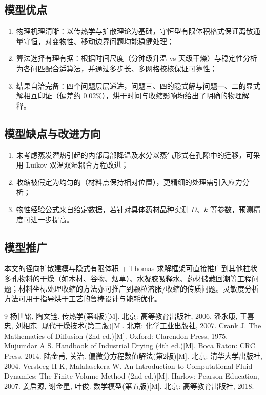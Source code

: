 \documentclass[withoutpreface,bwprint]{cumcmthesis} %
\begin{document}
\subsection{模型优点}

\begin{enumerate}
\item 物理机理清晰：以传热学与扩散理论为基础，守恒型有限体积格式保证离散通量守恒，对变物性、移动边界问题均能稳健处理；
\item 算法选择有理有据：根据时间尺度（分钟级升温 vs 天级干燥）与稳定性分析为各问匹配合适算法，并通过多步长、多网格校核保证可靠性；
\item 结果自洽完备：四个问题层层递进，问题三、四的隐式解与问题一、二的显式解相互印证（偏差约 0.02\%），烘干时间与收缩影响均给出了明确的物理解释。
\end{enumerate}

\subsection{模型缺点与改进方向}

\begin{enumerate}
\item 未考虑蒸发潜热引起的内部局部降温及水分以蒸气形式在孔隙中的迁移，可采用 Luikov 双温双湿耦合方程改进；
\item 收缩被假定为均匀的（材料点保持相对位置），更精细的处理需引入应力分析；
\item 物性经验公式来自给定数据，若针对具体药材品种实测 $D$、$k$ 等参数，预测精度可进一步提高。
\end{enumerate}

\subsection{模型推广}

本文的径向扩散建模与隐式有限体积 + Thomas 求解框架可直接推广到其他柱状多孔物料的干燥（如木材、谷物、烟草）、水凝胶吸释水、药材储藏回潮等工程问题；材料坐标处理收缩的方法亦可推广到颗粒溶胀/收缩的传质问题。灵敏度分析方法可用于指导烘干工艺的鲁棒设计与能耗优化。

\begin{thebibliography}{9}
 杨世铭, 陶文铨. 传热学(第4版)[M]. 北京: 高等教育出版社, 2006.
 潘永康, 王喜忠, 刘相东. 现代干燥技术(第二版)[M]. 北京: 化学工业出版社, 2007.
 Crank J. The Mathematics of Diffusion (2nd ed.)[M]. Oxford: Clarendon Press, 1975.
 Mujumdar A S. Handbook of Industrial Drying (4th ed.)[M]. Boca Raton: CRC Press, 2014.
 陆金甫, 关治. 偏微分方程数值解法(第2版)[M]. 北京: 清华大学出版社, 2004.
 Versteeg H K, Malalasekera W. An Introduction to Computational Fluid Dynamics: The Finite Volume Method (2nd ed.)[M]. Harlow: Pearson Education, 2007.
 姜启源, 谢金星, 叶俊. 数学模型(第五版)[M]. 北京: 高等教育出版社, 2018.
\end{thebibliography}
\end{document}
